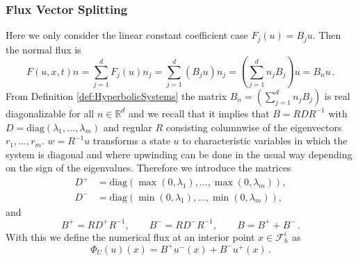 \documentclass[a4paper,12pt]{article}
\theoremstyle{definition}
\theoremstyle{definition}
\newcommand{\Dim}{d}
\begin{document}
\subsubsection{Flux Vector Splitting}

Here we only consider the linear constant coefficient case $F_j(u) = B_j u$. Then the normal flux is
\begin{equation}
F(u,x,t)n = \sum_{j=1}^{\Dim} F_j(u) n_j = \sum_{j=1}^{\Dim} (B_j u) n_j
=\left( \sum_{j=1}^{\Dim} n_j B_j\right) u = B_n u \, .
\end{equation}
From Definition \ref{def:HyperbolicSystems} the matrix $B_n = \left( \sum_{j=1}^{\Dim} n_j B_j\right)$
is real diagonalizable for all $n\in\mathbb{R}^{\Dim}$ and we recall
that it implies that $B=RDR^{-1}$ with $D=\text{diag}(\lambda_1,\ldots,\lambda_m)$
and regular $R$ consisting columnwise of the eigenvectors $r_1,\ldots,r_m$.
$w=R^{-1} u$ transforms a state $u$ to characteristic variables in which the system
is diagonal and where upwinding can be done in the usual way depending on the
sign of the eigenvalues. Therefore we introduce the matrices
\begin{align*}
D^+&=\text{diag}(\max(0,\lambda_1),\ldots,\max(0,\lambda_m)), \\
D^-&=\text{diag}(\min(0,\lambda_1),\ldots,\min(0,\lambda_m)),
\end{align*}
and
\begin{equation}
B^+ = RD^+R^{-1}, \qquad B^- = RD^-R^{-1}, \qquad B = B^+ + B^- \, .
\end{equation}
With this we define the numerical flux at an interior point $x\in\mathcal{F}_h^i$ as
\begin{equation}\label{eq:system_upwind}
\Phi_U(u)(x) = B^+ u^-(x) + B^- u^+(x) \, .
\end{equation}

\end{document}
